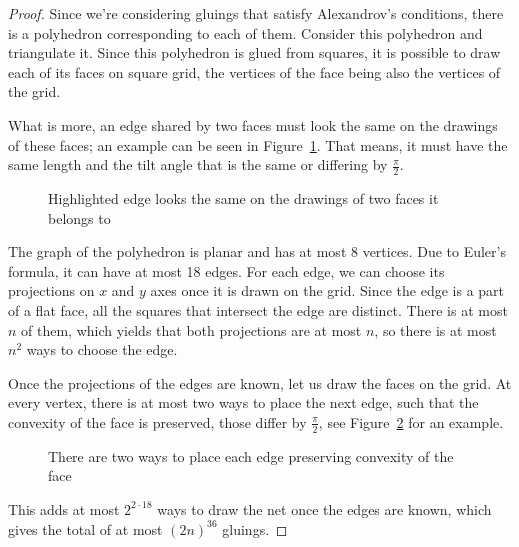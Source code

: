 \documentclass[a4paper,11pt]{article}
\begin{document}
\begin{proof}
Since we're considering gluings that satisfy Alexandrov's conditions, there is a polyhedron corresponding to each of them. Consider this polyhedron and triangulate it. Since this polyhedron is glued from squares, it is possible to draw each of its faces on square grid, the vertices of the face being also the vertices of the grid.

What is more, an edge shared by two faces must look the same on the drawings of these faces; an example can be seen in Figure~\ref{fig:edgesMeeting}. That means, it must have the same length and the tilt angle that is the same or differing by $\frac{\pi}{2}$. 

\begin{figure}[h] \centering
{}\hspace{1.2cm}
\caption{Highlighted edge looks the same on the drawings of two faces it belongs to}
\label{fig:edgesMeeting}
\end{figure}

The graph of the polyhedron is planar and has at most 8 vertices. Due to Euler's formula, it can have at most 18 edges. For each edge, we can choose its projections on $x$ and $y$ axes once it is drawn on the grid. Since the edge is a part of a flat face, all the squares that intersect the edge are distinct. There is at most $n$ of them, which yields that both projections are at most $n$, so there is at most $n^2$ ways to choose the edge.

Once the projections of the edges are known, let us draw the faces on the grid. At every vertex, there is at most two ways to place the next edge, such that the convexity of the face is preserved, those differ by $\frac{\pi}{2}$, see Figure~\ref{fig:twoWays} for an example.

\begin{figure}[h] \centering
{}
\caption{There are two ways to place each edge preserving convexity of the face}
\label{fig:twoWays}
\end{figure}

This adds at most $2^{2 \cdot 18}$ ways to draw the net once the edges are known, which gives the total of at most $(2n)^{36}$ gluings.
\end{proof}
\end{document}
